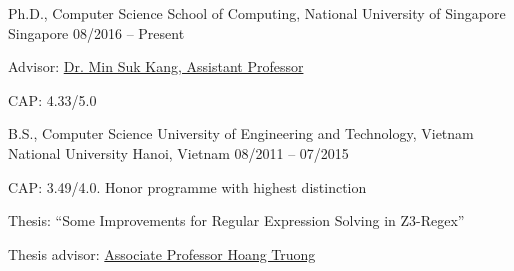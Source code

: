 


\begin{cventries}

  \cventry
    {Ph.D., Computer Science} %
    {School of Computing, National University of Singapore} %
    {Singapore} %
    {08/2016 -- Present} %
    {
      \begin{cvitems} %
        \item {Advisor: \href{http://www.comp.nus.edu.sg/~kangms/}{Dr. Min Suk Kang, Assistant Professor}}
        \item {CAP: 4.33/5.0}
      \end{cvitems}
    }

  \cventry
    {B.S., Computer Science} %
    {University of Engineering and Technology, Vietnam National University} %
    {Hanoi, Vietnam} %
    {08/2011 -- 07/2015} %
    {
      \begin{cvitems} %
        \item {CAP: 3.49/4.0. Honor programme with highest distinction}
        \item {Thesis: ``Some Improvements for Regular Expression Solving in Z3-Regex''}
        \item {Thesis advisor: \href{http://www.uet.vnu.edu.vn/~hoangta/}{Associate Professor Hoang Truong}}
      \end{cvitems}
    }


\end{cventries}
